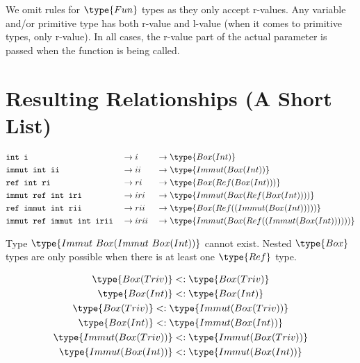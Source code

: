 \documentclass{article}
\newcommand\subtype{\mathrel{<:}}
\newcommand{\syntax}{\texttt}
\begin{document}
\medskip

We omit rules for $\type{Fun}$ types as they only accept r-values.
Any variable and/or primitive type has both r-value and l-value (when it comes
to primitive types, only r-value). In all cases, the r-value part of the actual
parameter is passed when the function is being called.


\section*{Resulting Relationships (A Short List)}

\begin{align*}
  &\syntax{int i}                    &&\to i    &&\to \type{Box(Int)}\\
  &\syntax{immut int ii}             &&\to ii   &&\to \type{Immut(Box(Int))}\\
  &\syntax{ref int ri}               &&\to ri   &&\to \type{Box(Ref(Box(Int)))}\\
  &\syntax{immut ref int iri}        &&\to iri  &&\to \type{Immut(Box(Ref(Box(Int))))}\\
  &\syntax{ref immut int rii}        &&\to rii  &&\to \type{Box(Ref((Immut(Box(Int)))))}\\
  &\syntax{immut ref immut int irii} &&\to irii &&\to \type{Immut(Box(Ref((Immut(Box(Int))))))}
\end{align*}

\medskip

Type $\type{Immut\ Box(Immut\ Box(Int))}$ cannot exist. Nested $\type{Box}$
types are only possible when there is at least one $\type{Ref}$ type.

\begin{gather*}
  \type{Box(Triv)}        \subtype \type{Box(Triv)}\\
  \type{Box(Int)}         \subtype \type{Box(Int)}\\
  \type{Box(Triv)}        \subtype \type{Immut(Box(Triv))}\\
  \type{Box(Int)}         \subtype \type{Immut(Box(Int))}\\
  \type{Immut(Box(Triv))} \subtype \type{Immut(Box(Triv))}\\
  \type{Immut(Box(Int))}  \subtype \type{Immut(Box(Int))}
\end{gather*}
\end{document}
